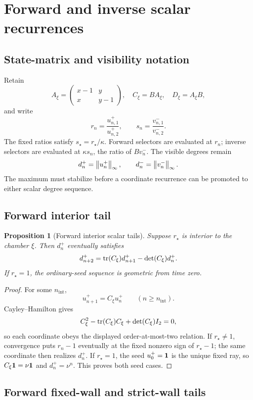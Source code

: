 \documentclass[11pt]{article}
\newtheorem{proposition}[theorem]{Proposition}
\theoremstyle{definition}
\theoremstyle{remark}
\begin{document}
\section{Forward and inverse scalar recurrences}

\subsection{State-matrix and visibility notation}

Retain
\[
A_\xi=\begin{pmatrix}x-1&y\\x&y-1\end{pmatrix},
\quad C_\xi=BA_\xi,\quad D_\xi=A_\xi B,
\]
and write
\[
r_n=\frac{u^+_{n,1}}{u^+_{n,2}},\qquad
s_n=\frac{v^-_{n,1}}{v^-_{n,2}}.
\]
The fixed ratios satisfy \(s_\star=r_\star/\kappa\).  Forward selectors
are evaluated at \(r_n\); inverse selectors are evaluated at
\(\kappa s_n\), the ratio of \(Bv_n^-\).  The visible degrees remain
\[
d_n^+=\left\lVert u_n^+\right\rVert_{\infty},\qquad d_n^-=\left\lVert v_n^-\right\rVert_{\infty}.
\]
The maximum must stabilize before a coordinate recurrence can be promoted
to either scalar degree sequence.

\subsection{Forward interior tail}

\begin{proposition}[Forward interior scalar tails]
\label{prop:forward-interior-recurrence}
Suppose \(r_\star\) is interior to the chamber \(\xi\).  Then \(d_n^+\)
eventually satisfies
\[
d^+_{n+2}=\operatorname{tr}(C_\xi)d^+_{n+1}-\det(C_\xi)d^+_n.
\]
If \(r_\star=1\), the ordinary-seed sequence is geometric from time zero.
\end{proposition}

\begin{proof}
For some \(n_{\mathrm{int}}\),
\[
u^+_{n+1}=C_\xi u^+_n\qquad(n\geq n_{\mathrm{int}}).
\]
Cayley--Hamilton gives
\[
C_\xi^2-\operatorname{tr}(C_\xi)C_\xi+\det(C_\xi)I_2=0,
\]
so each coordinate obeys the displayed order-at-most-two relation.  If
\(r_\star\neq1\), convergence puts \(r_n-1\) eventually at the fixed
nonzero sign of \(r_\star-1\); the same coordinate then realizes
\(d_n^+\).  If \(r_\star=1\), the seed \(u_0^+=\mathbf{1}\) is the unique fixed
ray, so \(C_\xi\mathbf{1}=\nu\mathbf{1}\) and
\(d_n^+=\nu^n\).  This proves both seed cases.
\end{proof}

\subsection{Forward fixed-wall and strict-wall tails}
\end{document}
